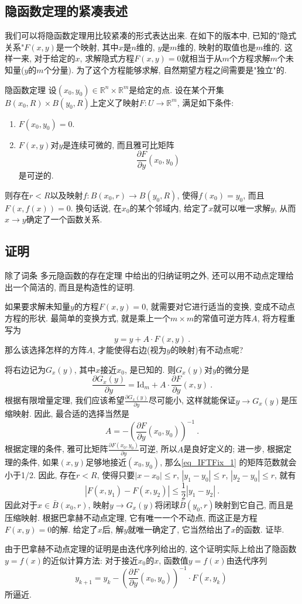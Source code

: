

\subsection{隐函数定理的紧凑表述}
我们可以将隐函数定理用比较紧凑的形式表达出来. 在如下的版本中, 已知的"隐式关系"$F(x,y)$是一个映射, 其中$x$是$n$维的, $y$是$m$维的, 映射的取值也是$m$维的. 这样一来, 对于给定的$x$, 求解隐式方程$F(x,y)=0$就相当于从$m$个方程求解$m$个未知量($y$的$m$个分量). 为了这个方程能够求解, 自然期望方程之间需要是"独立"的.
\begin{theorem}{隐函数定理}
设$(x_0,y_0)\in\mathbb{R}^n\times\mathbb{R}^m$是给定的点. 设在某个开集$B(x_0,R)\times B(y_0,R)$上定义了映射$F:U\to\mathbb{R}^m$, 满足如下条件:
\begin{enumerate}
\item $F(x_0,y_0)=0$.
\item $F(x,y)$对$y$是连续可微的, 而且雅可比矩阵
$$
\frac{\partial F}{\partial y}(x_0,y_0)~
$$
是可逆的.
\end{enumerate}
则存在$r<R$以及映射$f:B(x_0,r)\to B(y_0,R)$, 使得$f(x_0)=y_0$, 而且$F(x,f(x))=0$. 换句话说, 在$x_0$的某个邻域内, 给定了$x$就可以唯一求解$y$, 从而$x\to y$确定了一个函数关系.
\end{theorem}

\subsection{证明}
除了词条 多元隐函数的存在定理 中给出的归纳证明之外, 还可以用不动点定理给出一个简洁的, 而且是构造性的证明.

如果要求解未知量$y$的方程$F(x,y)=0$, 就需要对它进行适当的变换, 变成不动点方程的形状. 最简单的变换方式, 就是乘上一个$m\times m$的常值可逆方阵$A$, 将方程重写为
$$
y=y+A\cdot F(x,y)~.
$$
那么该选择怎样的方阵$A$, 才能使得右边(视为$y$的映射)有不动点呢?

将右边记为$G_x(y)$, 其中$x$接近$x_0$, 是已知的. 则$G_x(y)$对$y$的微分是
\begin{equation}\label{eq_IFTFix_1}
\frac{\partial G_x(y)}{\partial y}=\mathrm{Id}_m+A\cdot\frac{\partial F}{\partial y}(x,y)~.
\end{equation}
根据有限增量定理, 我们应该希望$\frac{\partial G_x(y)}{\partial y}$尽可能小, 这样就能保证$y\to G_x(y)$是压缩映射. 因此, 最合适的选择当然是
$$
A=-\left(\frac{\partial F}{\partial y}(x_0,y_0)\right)^{-1}~.
$$
根据定理的条件, 雅可比矩阵$\frac{\partial F(x_0,y_0)}{\partial y}$可逆, 所以$A$是良好定义的; 进一步, 根据定理的条件, 如果$(x,y)$足够地接近$(x_0,y_0)$, 那么\autoref{eq_IFTFix_1} 的矩阵范数就会小于1/2. 因此, 存在$r<R$, 使得只要$|x-x_0|\leq r$, $|y_1-y_0|\leq r$, $|y_2-y_0|\leq r$, 就有
$$
|F(x,y_1)-F(x,y_2)|\leq\frac{1}{2}|y_1-y_2|~.
$$  
因此对于$x\in \bar B(x_0,r)$, 映射$y\to G_x(y)$将闭球$\bar B(y_0,r)$映射到它自己, 而且是压缩映射. 根据巴拿赫不动点定理, 它有唯一一个不动点, 而这正是方程$F(x,y)=0$的解. 给定了$x$后, 解$y$就唯一确定了, 它当然给出了$x$的函数. 证毕.

由于巴拿赫不动点定理的证明是由迭代序列给出的, 这个证明实际上给出了隐函数$y=f(x)$的近似计算方法: 对于接近$x_0$的$x$, 函数值$y=f(x)$由迭代序列
$$
y_{k+1}=y_k-\left(\frac{\partial F}{\partial y}(x_0,y_0)\right)^{-1}\cdot F(x,y_k)~
$$
所逼近.